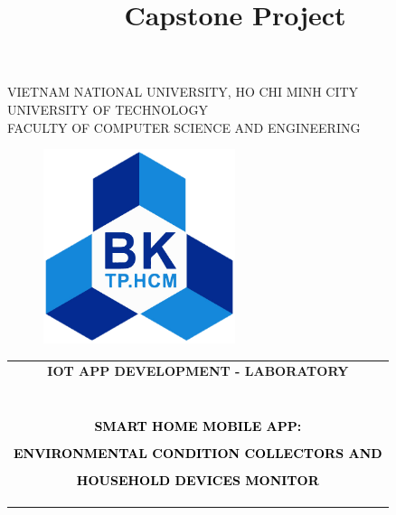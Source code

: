 \documentclass[a4paper]{report}
\author{}
\title{Capstone Project}
\date{}
\begin{document}
\begin{titlepage}
  \begin{center}
    VIETNAM NATIONAL UNIVERSITY, HO CHI MINH CITY\\
    UNIVERSITY OF TECHNOLOGY\\
    FACULTY OF COMPUTER SCIENCE AND ENGINEERING
  \end{center}

  \vspace{1cm}

  \begin{figure}[ht]
    \centering
    \includegraphics[width=0.5\textwidth]{hcmut.png}
  \end{figure}

  \vspace{1cm}

  \begin{center}
    \begin{tabular}{c}
      \multicolumn{1}{c}{\textbf{{\Large \color{blue} IOT APP DEVELOPMENT - LABORATORY}}} \\ \\
      ~~                                                                                  \\
      \hline
      \\

      \textcolor{black}{\textbf{{\large SMART HOME MOBILE APP:}}}                         \\\\
      \textcolor{black}{\textbf{{\large ENVIRONMENTAL CONDITION COLLECTORS AND}}}         \\\\
      \textcolor{black}{\textbf{{\large HOUSEHOLD DEVICES MONITOR}}}                      \\\\                                                                                 \\
      \hline
      \\
    \end{tabular}
  \end{center}


\end{titlepage}
\end{document}
